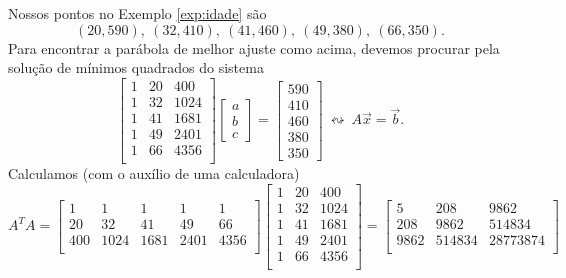 \documentclass[../livro.tex]{subfiles}  %
\begin{document}
\begin{example}
  Nossos pontos no Exemplo \ref{exp:idade} são
  \begin{equation}
  (20, 590), \ (32, 410), \ (41, 460), \ (49, 380), \ (66, 350).
  \end{equation} Para encontrar a parábola de melhor ajuste como acima, devemos procurar pela solução de mínimos quadrados do sistema
  \begin{equation}
  \begin{bmatrix}
    1 & 20 & 400 \\
    1 & 32 & 1024 \\
    1 & 41 & 1681 \\
    1 & 49 & 2401 \\
    1 & 66 & 4356 \\
  \end{bmatrix}
  \begin{bmatrix}
    a \\ b \\ c
  \end{bmatrix} =
  \begin{bmatrix}
    590 \\ 410 \\ 460 \\ 380 \\ 350
  \end{bmatrix} \ \leftrightsquigarrow \ A \vec{x} = \vec{b}.
  \end{equation} Calculamos (com o auxílio de uma calculadora)
  \begin{equation}
  A^T A =
  \begin{bmatrix}
    1 & 1 & 1 & 1 & 1 \\
    20 & 32 & 41 & 49 & 66 \\
    400 & 1024 & 1681 & 2401 & 4356 \\
  \end{bmatrix}
  \begin{bmatrix}
    1 & 20 & 400 \\
    1 & 32 & 1024 \\
    1 & 41 & 1681 \\
    1 & 49 & 2401 \\
    1 & 66 & 4356 \\
  \end{bmatrix} =
  \begin{bmatrix}
    5 & 208 & 9862 \\
    208 & 9862 & 514834 \\
    9862 & 514834 & 28773874 \\

\end{bmatrix}
\end{equation}
\end{example}
\end{document}
